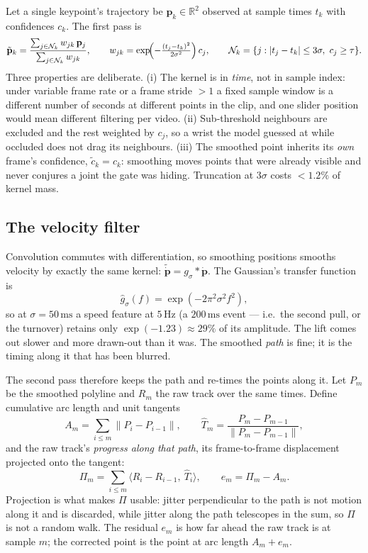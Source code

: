 \documentclass[10pt,a4paper]{article}
\newcommand{\conf}{c}
\begin{document}
Let a single keypoint's trajectory be $\mathbf{p}_k\in\mathbb{R}^2$ observed at
sample times $t_k$ with confidences $\conf_k$. The first pass is
\[
  \tilde{\mathbf{p}}_k=\frac{\sum_{j\in\mathcal{N}_k} w_{jk}\,\mathbf{p}_j}{\sum_{j\in\mathcal{N}_k} w_{jk}},
  \qquad
  w_{jk}=\exp\!\Bigl(-\tfrac{(t_j-t_k)^2}{2\sigma^2}\Bigr)\,\conf_j,
  \qquad
  \mathcal{N}_k=\{j: |t_j-t_k|\le 3\sigma,\ \conf_j\ge\tau\}.
\]
Three properties are deliberate. (i) The kernel is in \emph{time}, not in
sample index: under variable frame rate or a frame stride $>1$ a fixed sample
window is a different number of seconds at different points in the clip, and one
slider position would mean different filtering per video. (ii) Sub-threshold
neighbours are excluded and the rest weighted by $\conf_j$, so a wrist the model
guessed at while occluded does not drag its neighbours. (iii) The smoothed point
inherits its \emph{own} frame's confidence, $\tilde{\conf}_k=\conf_k$: smoothing
moves points that were already visible and never conjures a joint the gate was
hiding. Truncation at $3\sigma$ costs $<1.2\%$ of kernel mass.

\subsection{The velocity filter}

Convolution commutes with differentiation, so smoothing positions smooths
velocity by exactly the same kernel: $\widetilde{\dot{\mathbf{p}}}=g_\sigma*\dot{\mathbf{p}}$.
The Gaussian's transfer function is
\[
  \hat{g}_\sigma(f)=\exp(-2\pi^2\sigma^2f^2),
\]
so at $\sigma=50\,\mathrm{ms}$ a speed feature at $5\,\mathrm{Hz}$ (a
$200\,\mathrm{ms}$ event --- i.e.\ the second pull, or the turnover) retains only
$\exp(-1.23)\approx29\%$ of its amplitude. The lift comes out slower and more
drawn-out than it was. The smoothed \emph{path} is fine; it is the timing along
it that has been blurred.

The second pass therefore keeps the path and re-times the points along it. Let
$P_m$ be the smoothed polyline and $R_m$ the raw track over the same times.
Define cumulative arc length and unit tangents
\[
  A_m=\sum_{i\le m}\lVert P_i-P_{i-1}\rVert,
  \qquad
  \hat{T}_m=\frac{P_m-P_{m-1}}{\lVert P_m-P_{m-1}\rVert},
\]
and the raw track's \emph{progress along that path}, its frame-to-frame
displacement projected onto the tangent:
\[
  \Pi_m=\sum_{i\le m}\bigl\langle R_i-R_{i-1},\ \hat{T}_i\bigr\rangle,
  \qquad
  e_m=\Pi_m-A_m .
\]
Projection is what makes $\Pi$ usable: jitter perpendicular to the path is not
motion along it and is discarded, while jitter along the path telescopes in the
sum, so $\Pi$ is not a random walk. The residual $e_m$ is how far ahead the raw
track is at sample $m$; the corrected point is the point at arc length
$A_m+e_m$.
\end{document}
